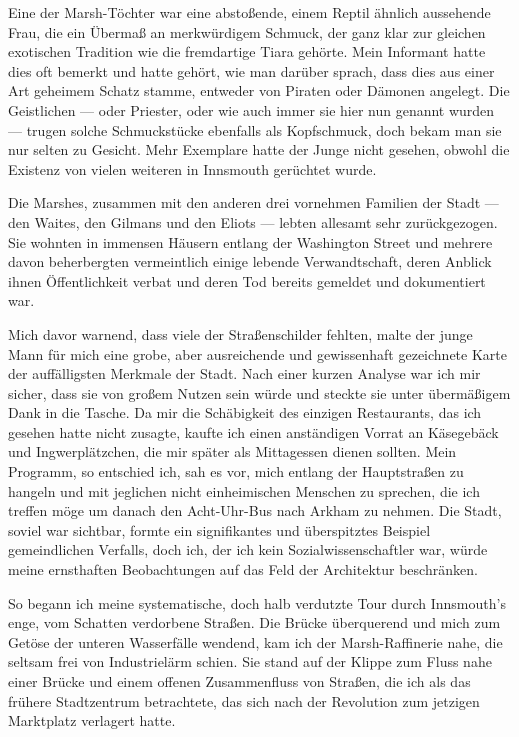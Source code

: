 Eine der Marsh-Töchter war eine  abstoßende, einem Reptil ähnlich aussehende Frau, die ein Übermaß an merkwürdigem Schmuck, der ganz klar zur gleichen exotischen Tradition wie die fremdartige Tiara gehörte. Mein Informant hatte dies oft bemerkt und hatte gehört, wie man darüber sprach, dass dies aus einer Art geheimem Schatz stamme, entweder von Piraten oder Dämonen angelegt. Die Geistlichen --- oder Priester, oder wie auch immer sie hier nun genannt wurden --- trugen solche Schmuckstücke ebenfalls als Kopfschmuck, doch bekam man sie nur selten zu Gesicht. Mehr Exemplare hatte der Junge nicht gesehen, obwohl die Existenz von vielen weiteren in Innsmouth gerüchtet wurde.

Die Marshes, zusammen mit den anderen drei vornehmen Familien der Stadt --- den Waites, den Gilmans und den Eliots --- lebten allesamt sehr zurückgezogen. Sie wohnten in immensen Häusern entlang der Washington Street und mehrere davon beherbergten vermeintlich einige lebende Verwandtschaft, deren Anblick ihnen Öffentlichkeit verbat und deren Tod bereits gemeldet und dokumentiert war.

Mich davor warnend, dass viele der Straßenschilder fehlten, malte der junge Mann für mich eine grobe, aber ausreichende und gewissenhaft gezeichnete Karte der auffälligsten Merkmale der Stadt. Nach einer kurzen Analyse war ich mir sicher, dass sie von großem Nutzen sein würde und steckte sie unter übermäßigem Dank in die Tasche. Da mir die Schäbigkeit des einzigen Restaurants, das ich gesehen hatte nicht zusagte, kaufte ich einen anständigen Vorrat an Käsegebäck und Ingwerplätzchen, die mir später als Mittagessen dienen sollten. Mein Programm, so entschied ich, sah es vor, mich entlang der Hauptstraßen zu hangeln und mit jeglichen nicht einheimischen Menschen zu sprechen, die ich treffen möge um danach den Acht-Uhr-Bus nach Arkham zu nehmen. Die Stadt, soviel war sichtbar, formte ein signifikantes und überspitztes Beispiel gemeindlichen Verfalls, doch ich, der ich kein Sozialwissenschaftler war, würde meine ernsthaften Beobachtungen auf das Feld der Architektur beschränken.

So begann ich meine systematische, doch halb verdutzte Tour durch Innsmouth's enge, vom Schatten verdorbene Straßen. Die Brücke überquerend und mich zum Getöse der unteren Wasserfälle wendend, kam ich der Marsh-Raffinerie nahe, die seltsam frei von Industrielärm schien. Sie stand auf der Klippe zum Fluss nahe einer Brücke und einem offenen Zusammenfluss von Straßen, die ich als das frühere Stadtzentrum betrachtete, das  sich nach der Revolution zum jetzigen Marktplatz verlagert hatte.

